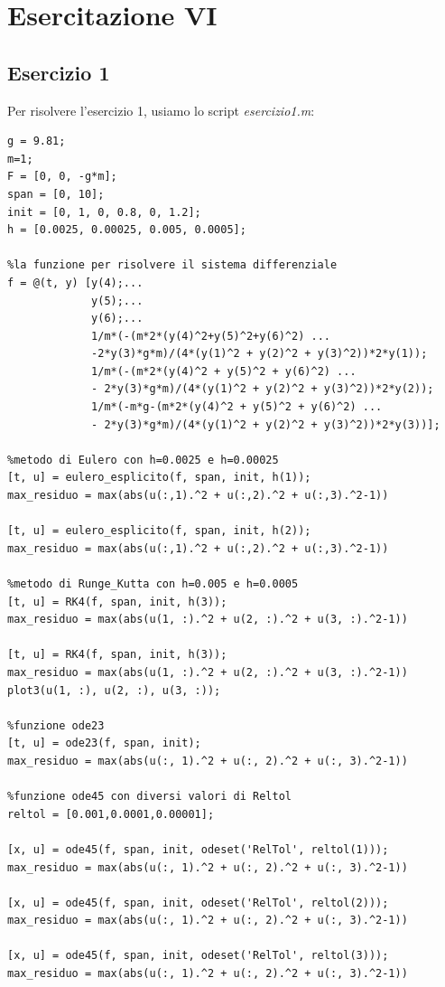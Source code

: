 \documentclass[11pt,a4paper,twoside,openright,titlepage,
headinclude,footinclude,BCOR5mm,
numbers=noenddot,cleardoublepage=empty,
tablecaptionabove]{scrbook}
\begin{document}
\section{Esercitazione VI}
\subsection{Esercizio 1}
Per risolvere l'esercizio 1, usiamo lo script \emph{esercizio1.m}:
\begin{lstlisting}[frame = trBL]
g = 9.81;
m=1;
F = [0, 0, -g*m];
span = [0, 10];
init = [0, 1, 0, 0.8, 0, 1.2];
h = [0.0025, 0.00025, 0.005, 0.0005];

%la funzione per risolvere il sistema differenziale
f = @(t, y) [y(4);...
             y(5);...
             y(6);...
             1/m*(-(m*2*(y(4)^2+y(5)^2+y(6)^2) ...
             -2*y(3)*g*m)/(4*(y(1)^2 + y(2)^2 + y(3)^2))*2*y(1));
             1/m*(-(m*2*(y(4)^2 + y(5)^2 + y(6)^2) ...
             - 2*y(3)*g*m)/(4*(y(1)^2 + y(2)^2 + y(3)^2))*2*y(2));
             1/m*(-m*g-(m*2*(y(4)^2 + y(5)^2 + y(6)^2) ...
             - 2*y(3)*g*m)/(4*(y(1)^2 + y(2)^2 + y(3)^2))*2*y(3))];

%metodo di Eulero con h=0.0025 e h=0.00025             
[t, u] = eulero_esplicito(f, span, init, h(1));
max_residuo = max(abs(u(:,1).^2 + u(:,2).^2 + u(:,3).^2-1))

[t, u] = eulero_esplicito(f, span, init, h(2));
max_residuo = max(abs(u(:,1).^2 + u(:,2).^2 + u(:,3).^2-1))

%metodo di Runge_Kutta con h=0.005 e h=0.0005
[t, u] = RK4(f, span, init, h(3));
max_residuo = max(abs(u(1, :).^2 + u(2, :).^2 + u(3, :).^2-1))

[t, u] = RK4(f, span, init, h(3));
max_residuo = max(abs(u(1, :).^2 + u(2, :).^2 + u(3, :).^2-1))
plot3(u(1, :), u(2, :), u(3, :));

%funzione ode23
[t, u] = ode23(f, span, init);
max_residuo = max(abs(u(:, 1).^2 + u(:, 2).^2 + u(:, 3).^2-1))

%funzione ode45 con diversi valori di Reltol
reltol = [0.001,0.0001,0.00001];

[x, u] = ode45(f, span, init, odeset('RelTol', reltol(1)));
max_residuo = max(abs(u(:, 1).^2 + u(:, 2).^2 + u(:, 3).^2-1))

[x, u] = ode45(f, span, init, odeset('RelTol', reltol(2)));
max_residuo = max(abs(u(:, 1).^2 + u(:, 2).^2 + u(:, 3).^2-1))

[x, u] = ode45(f, span, init, odeset('RelTol', reltol(3)));
max_residuo = max(abs(u(:, 1).^2 + u(:, 2).^2 + u(:, 3).^2-1))
\end{lstlisting}
\end{document}
